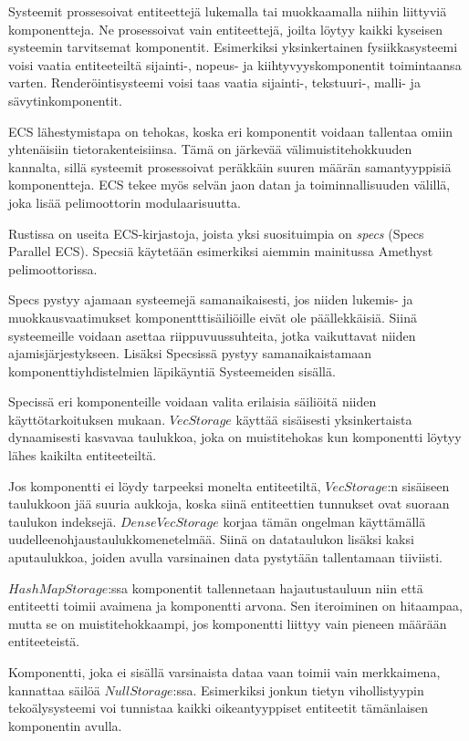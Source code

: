 \documentclass[finnish]{tktltiki2}
\theoremstyle{definition}
\theoremstyle{remark}
\begin{document}
Systeemit prossesoivat entiteettejä lukemalla tai muokkaamalla niihin liittyviä komponentteja. Ne prosessoivat vain entiteettejä, joilta löytyy kaikki kyseisen systeemin tarvitsemat komponentit. Esimerkiksi yksinkertainen fysiikkasysteemi voisi vaatia entiteeteiltä sijainti-, nopeus- ja kiihtyvyyskomponentit toimintaansa varten. Renderöintisysteemi voisi taas vaatia sijainti-, tekstuuri-, malli- ja sävytinkomponentit.

ECS lähestymistapa on tehokas, koska eri komponentit voidaan tallentaa omiin yhtenäisiin tietorakenteisiinsa. Tämä on järkevää välimuistitehokkuuden kannalta, sillä systeemit prosessoivat peräkkäin suuren määrän samantyyppisiä komponentteja. ECS tekee myös selvän jaon datan ja toiminnallisuuden välillä, joka lisää pelimoottorin modulaarisuutta.

Rustissa on useita ECS-kirjastoja, joista yksi suosituimpia on \textit{specs} (Specs Parallel ECS)\cite{AreWeGameYetEcs}. Specsiä käytetään esimerkiksi aiemmin mainitussa Amethyst pelimoottorissa. 

Specs pystyy ajamaan systeemejä samanaikaisesti, jos niiden lukemis- ja muokkausvaatimukset komponentttisäiliöille eivät ole päällekkäisiä. Siinä systeemeille voidaan asettaa riippuvuussuhteita, jotka vaikuttavat niiden ajamisjärjestykseen. Lisäksi Specsissä pystyy samanaikaistamaan komponenttiyhdistelmien läpikäyntiä Systeemeiden sisällä.

Specissä eri komponenteille voidaan valita erilaisia säiliöitä niiden käyttötarkoituksen mukaan. $VecStorage$ käyttää sisäisesti yksinkertaista dynaamisesti kasvavaa taulukkoa, joka on muistitehokas kun komponentti löytyy lähes kaikilta entiteeteiltä. 

Jos komponentti ei löydy tarpeeksi monelta entiteetiltä, $VecStorage$:n sisäiseen taulukkoon jää suuria aukkoja, koska siinä entiteettien tunnukset ovat suoraan taulukon indeksejä. $DenseVecStorage$ korjaa tämän ongelman käyttämällä uudelleenohjaustaulukkomenetelmää. Siinä on datataulukon lisäksi kaksi aputaulukkoa, joiden avulla varsinainen data pystytään tallentamaan tiiviisti.

$HashMapStorage$:ssa komponentit tallennetaan hajautustauluun niin että entiteetti toimii avaimena ja komponentti arvona. Sen iteroiminen on hitaampaa, mutta se on muistitehokkaampi, jos komponentti liittyy vain pieneen määrään entiteeteistä.  

Komponentti, joka ei sisällä varsinaista dataa vaan toimii vain merkkaimena, kannattaa säilöä $NullStorage$:ssa. Esimerkiksi jonkun tietyn vihollistyypin tekoälysysteemi voi tunnistaa kaikki oikeantyyppiset entiteetit tämänlaisen komponentin avulla. 
\end{document}
